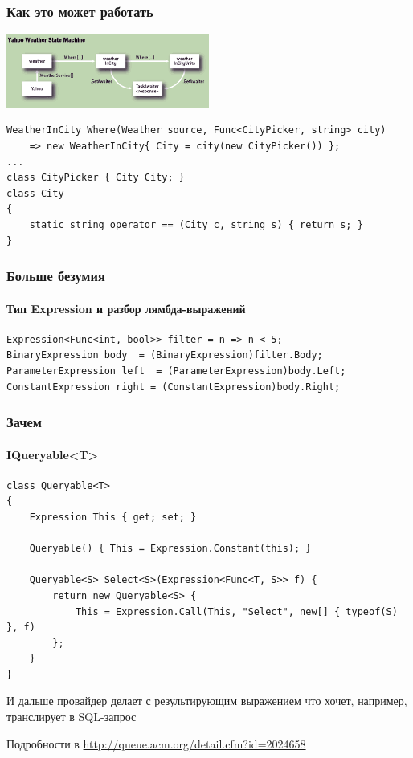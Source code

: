 \documentclass[xetex,mathserif,serif]{beamer}
\begin{document}
	\begin{frame}[fragile]
		\frametitle{Как это может работать}
		\begin{center}
			\includegraphics[width=0.5\textwidth]{yahooWeather.png}
		\end{center}
		\begin{verbatim}
WeatherInCity Where(Weather source, Func<CityPicker, string> city) 
    => new WeatherInCity{ City = city(new CityPicker()) }; 
...
class CityPicker { City City; } 
class City 
{ 
    static string operator == (City c, string s) { return s; } 
} 
		\end{verbatim}
	\end{frame}

	\begin{frame}[fragile]
		\frametitle{Больше безумия}
		\framesubtitle{Тип Expression и разбор лямбда-выражений}
		\begin{verbatim}
Expression<Func<int, bool>> filter = n => n < 5;
BinaryExpression body  = (BinaryExpression)filter.Body;
ParameterExpression left  = (ParameterExpression)body.Left;
ConstantExpression right = (ConstantExpression)body.Right;
		\end{verbatim}
	\end{frame}

	\begin{frame}[fragile]
		\frametitle{Зачем}
		\framesubtitle{IQueryable<T>}
		\begin{footnotesize}
			\begin{verbatim}
class Queryable<T> 
{ 
    Expression This { get; set; } 

    Queryable() { This = Expression.Constant(this); } 

    Queryable<S> Select<S>(Expression<Func<T, S>> f) { 
        return new Queryable<S> { 
            This = Expression.Call(This, "Select", new[] { typeof(S) }, f) 
        }; 
    }
} 
			\end{verbatim}
		\end{footnotesize}
		И дальше провайдер делает с результирующим выражением что хочет, например, транслирует в SQL-запрос

		Подробности в \url{http://queue.acm.org/detail.cfm?id=2024658}
	\end{frame}
\end{document}
